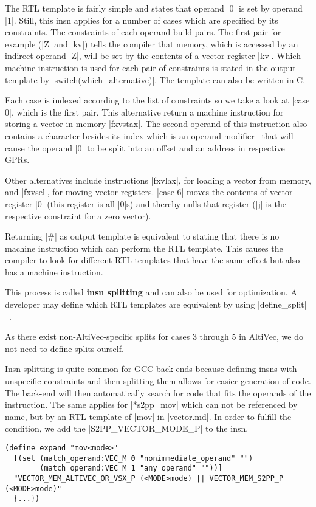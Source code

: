The \ac{RTL} template is fairly simple and states that operand |0| is set by operand |1|.
Still, this insn applies for a number of cases which are specified by its constraints.
The constraints of each operand build pairs.
The first pair for example (|Z| and |kv|) tells the compiler that memory, which is accessed by an indirect operand |Z|, will be set by the contents of a vector register |kv|.
Which machine instruction is used for each pair of constraints is stated in the output template by |switch(which_alternative)|.
The template can also be written in C.

Each case is indexed according to the list of constraints so we take a look at |case 0|, which is the first pair.
This alternative return a machine instruction for storing a vector in memory |fxvstax|.
The second operand of this instruction also contains a character besides its index which is an operand modifier~\citep[ch.~6.45.2]{GCCint} that will cause the operand |0| to be split into an offset and an address in respective GPRs.

Other alternatives include instructions |fxvlax|, for loading a vector from memory, and |fxvsel|, for moving vector registers.
|case 6| moves the contents of vector register |0| (this register is all |0|s) and thereby nulls that register (|j| is the respective constraint for a zero vector).

Returning |#| as output template is equivalent to stating that there is no machine instruction which can perform the \ac{RTL} template.
This causes the compiler to look for different \ac{RTL} templates that have the same effect but also has a machine instruction.

This process is called \textbf{insn splitting} and can also be used for optimization.
A developer may define which \ac{RTL} templates are equivalent by using |define_split|~\citep[16.16]{GCCint}.

As there exist non-AltiVec-specific splits for cases 3 through 5 in AltiVec, we do not need to define splits ourself.

Insn splitting is quite common for \ac{GCC} back-ends because defining insns with unspecific constraints and then splitting them allows for easier generation of code.
The back-end will then automatically search for code that fits the operands of the instruction.
The same applies for |*s2pp_mov| which can not be referenced by name, but by an \ac{RTL} template of |mov| in |vector.md|.
In order to fulfill the condition, we add the |S2PP_VECTOR_MODE_P| to the insn.
\begin{lstlisting}
(define_expand "mov<mode>"
  [(set (match_operand:VEC_M 0 "nonimmediate_operand" "")
        (match_operand:VEC_M 1 "any_operand" ""))]
  "VECTOR_MEM_ALTIVEC_OR_VSX_P (<MODE>mode) || VECTOR_MEM_S2PP_P (<MODE>mode)"
  {...})
\end{lstlisting}

